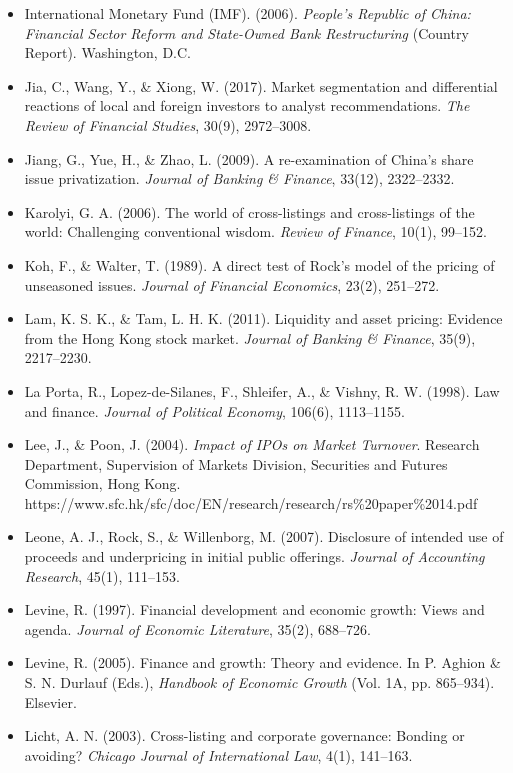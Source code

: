 \documentclass[11pt,letterpaper]{article}
\begin{document}
\begin{itemize}
\item International Monetary Fund (IMF). (2006). \textit{People’s Republic of China: Financial Sector Reform and State-Owned Bank Restructuring} (Country Report). Washington, D.C.
\item Jia, C., Wang, Y., \& Xiong, W. (2017). Market segmentation and differential reactions of local and foreign investors to analyst recommendations. \textit{The Review of Financial Studies}, 30(9), 2972–3008.
\item Jiang, G., Yue, H., \& Zhao, L. (2009). A re-examination of China's share issue privatization. \textit{Journal of Banking \& Finance}, 33(12), 2322–2332.
\item Karolyi, G. A. (2006). The world of cross-listings and cross-listings of the world: Challenging conventional wisdom. \textit{Review of Finance}, 10(1), 99–152.
\item Koh, F., \& Walter, T. (1989). A direct test of Rock's model of the pricing of unseasoned issues. \textit{Journal of Financial Economics}, 23(2), 251–272.
\item Lam, K. S. K., \& Tam, L. H. K. (2011). Liquidity and asset pricing: Evidence from the Hong Kong stock market. \textit{Journal of Banking \& Finance}, 35(9), 2217–2230.
\item La Porta, R., Lopez-de-Silanes, F., Shleifer, A., \& Vishny, R. W. (1998). Law and finance. \textit{Journal of Political Economy}, 106(6), 1113–1155.
\item Lee, J., \& Poon, J. (2004). \textit{Impact of IPOs on Market Turnover}. Research Department, Supervision of Markets Division, Securities and Futures Commission, Hong Kong. https://www.sfc.hk/sfc/doc/EN/research/research/rs\%20paper\%2014.pdf
\item Leone, A. J., Rock, S., \& Willenborg, M. (2007). Disclosure of intended use of proceeds and underpricing in initial public offerings. \textit{Journal of Accounting Research}, 45(1), 111–153.
\item Levine, R. (1997). Financial development and economic growth: Views and agenda. \textit{Journal of Economic Literature}, 35(2), 688–726.
\item Levine, R. (2005). Finance and growth: Theory and evidence. In P. Aghion \& S. N. Durlauf (Eds.), \textit{Handbook of Economic Growth} (Vol. 1A, pp. 865–934). Elsevier.
\item Licht, A. N. (2003). Cross-listing and corporate governance: Bonding or avoiding? \textit{Chicago Journal of International Law}, 4(1), 141–163.

\end{itemize}
\end{document}
